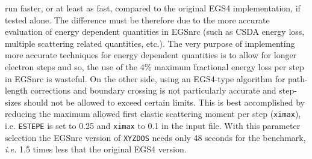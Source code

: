 run faster, or at least as fast, compared to the original EGS4 
implementation, if tested alone. The difference must be therefore 
due to the more accurate evaluation of energy dependent 
quantities in EGSnrc (such as CSDA energy loss, multiple 
scattering related quantities, etc.). The very purpose  of 
implementing more accurate techniques for energy dependent 
quantities is to allow for longer electron steps and so, 
the use of the 4\% maximum fractional energy loss per step 
in EGSnrc is wasteful. On the other side, using an 
EGS4-type algorithm for path-length corrections and 
boundary crossing is not particularly accurate and 
step-sizes should not be allowed to exceed certain 
limits. This is best accomplished by reducing the 
maximum allowed first elastic scattering moment per step 
({\tt ximax}), i.e.  {\tt ESTEPE} is set to 0.25 and 
{\tt ximax} to 0.1 in the input file. With this parameter 
selection the EGSnrc version of {\tt XYZDOS} needs only 
48 seconds for the benchmark, {\em i.e.} 1.5 times less 
that the original EGS4 version. 


